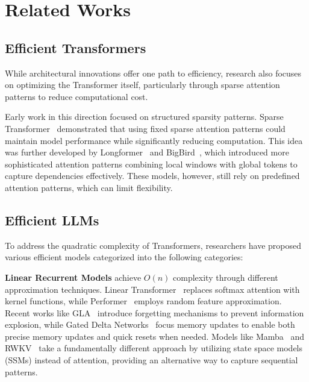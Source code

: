 \section{Related Works}
\label{related-works}

\subsection{Efficient Transformers}


While architectural innovations offer one path to efficiency, research also focuses on optimizing the Transformer itself, particularly through sparse attention patterns to reduce computational cost.

Early work in this direction focused on structured sparsity patterns. Sparse Transformer~\cite{sparsetransformer} demonstrated that using fixed sparse attention patterns could maintain model performance while significantly reducing computation. This idea was further developed by Longformer~\cite{Longformer} and BigBird~\cite{bigbird}, which introduced more sophisticated attention patterns combining local windows with global tokens to capture dependencies effectively. 
These models, however, still rely on predefined attention patterns, which can limit flexibility. \swt

\subsection{Efficient LLMs}

To address the quadratic complexity of Transformers, researchers have proposed various efficient models categorized into the following categories:

\textbf{Linear Recurrent Models} achieve $O(n)$ complexity through different approximation techniques. Linear Transformer~\cite{lineartransformer} replaces softmax attention with kernel functions, while Performer~\cite{performers} employs random feature approximation. Recent works like GLA~\cite{gla} introduce forgetting mechanisms to prevent information explosion, while Gated Delta Networks~\cite{gateddeltanet} focus memory updates to enable both precise memory updates and quick resets when needed. Models like Mamba~\cite{mamba} and RWKV~\cite{rwkv} take a fundamentally different approach by utilizing state space models (SSMs) instead of attention, providing an alternative way to capture sequential patterns.

